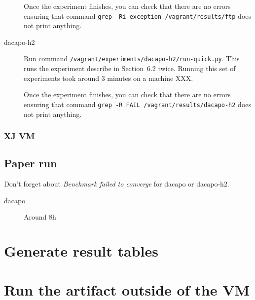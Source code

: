\documentclass[12pt]{article}
\begin{document}
\begin{description}
        Once the experiment finishes, you can check that there are no errors
        ensuring that command \texttt{grep -Ri exception /vagrant/results/ftp}
        does not print anything.

    \item[dacapo-h2] Run command
        \texttt{/vagrant/experiments/dacapo-h2/run-quick.py}.  This runs the
        experiment describe in Section~6.2 twice.  Running this set of
        experiments took around 3 minutes on a machine XXX.

        Once the experiment finishes, you can check that there are no errors
        ensuring that command \texttt{grep -R FAIL /vagrant/results/dacapo-h2}
        does not print anything.

\end{description}

\subsubsection{XJ VM}

\subsection{Paper run}
\label{sec:paper-run}

Don't forget about \emph{Benchmark failed to converge} for dacapo or dacapo-h2.

\begin{description}

    \item[dacapo] Around 8h

\end{description}

\section{Generate result tables}
\label{sec:tables}

\section{Run the artifact outside of the VM}
\end{document}
